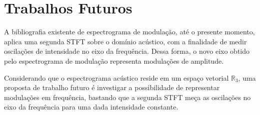 \section{Trabalhos Futuros}

A bibliografia existente de espectrograma de modulação, até o presente momento,
aplica uma segunda STFT sobre o domínio acústico, com a finalidade de medir
oscilações de intensidade no eixo da frequência. Dessa forma, o novo eixo obtido
pelo espectrograma de modulação representa modulações de amplitude.

Considerando
que o espectrograma acústico reside em um espaço vetorial $\mathbb{R}_3$, uma proposta de trabalho futuro é
investigar a possibilidade de representar modulações em frequência, bastando que a segunda
STFT meça as oscilações no eixo da frequência para uma dada intensidade
constante.